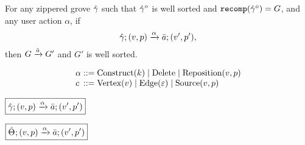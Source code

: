 \begin{theorem}[Sensibility]
  For any zippered grove $\Z{\Grove}$
  such that $\erase{\Z{\Grove}}$ is well sorted
    and $\recomp{\erase{\Z{\Grove}}} = G$,
  and any user action $\alpha$,
  if
  \[
    \applyAction{\Z{\Grove}}{v}{p}{\alpha}{\Q{a}}{v'}{p'},
  \]
  then $G \action{\Q{a}} G'$ and $G'$ is well sorted.
\end{theorem}

\[
  \arraycolsep=0pt
  \begin{array}{llll}
    \alpha & {}::={} &
      \Construct{k}
      \mid \Delete
      \mid \Reposition{v}{p}
    \\
    c & {}::={} &
      \CVertex{v}
      \mid \CEdge{\e}
      \mid \CSource{v}{p}
    \\
  \end{array}
\]

\noindent $\boxed{\applyAction{ \Z{\Grove} }{ v }{ p }{ \alpha }{ \Q{a} }{ v' }{ p' }}$
%
\begin{mathpar}


\end{mathpar}

\noindent $\boxed{\applyAction{ \Z{\Set} }{ v }{ p }{ \alpha }{ \Q{a} }{ v' }{ p' }}$
%
\begin{mathpar}
\end{mathpar}


